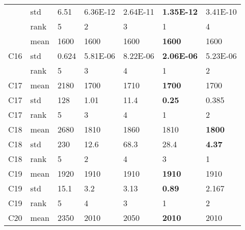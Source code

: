 \begin{table}[]
\begin{tabular}{|l|l|l|l|l|l|l|}
                     & std  & 6.51             & 6.36E-12          & 2.64E-11          & \textbf{1.35E-12} & 3.41E-10          \\ \cline{2-7} 
                     & rank & 5                & 2                 & 3                 & 1                 & 4                 \\ \hline
\multirow{3}{*}{C16} & mean & 1600             & 1600              & 1600              & \textbf{1600}     & 1600              \\ \cline{2-7} 
                     & std  & 0.624            & 5.81E-06          & 8.22E-06          & \textbf{2.06E-06} & 5.23E-06          \\ \cline{2-7} 
                     & rank & 5                & 3                 & 4                 & 1                 & 2                 \\ \hline
C17                  & mean & 2180             & 1700              & 1710              & \textbf{1700}     & 1700              \\ \hline
C17                  & std  & 128              & 1.01              & 11.4              & \textbf{0.25}     & 0.385             \\ \hline
C17                  & rank & 5                & 3                 & 4                 & 1                 & 2                 \\ \hline
C18                  & mean & 2680             & 1810              & 1860              & 1810              & \textbf{1800}     \\ \hline
C18                  & std  & 230              & 12.6              & 68.3              & 28.4              & \textbf{4.37}     \\ \hline
C18                  & rank & 5                & 2                 & 4                 & 3                 & 1                 \\ \hline
C19                  & mean & 1920             & 1910              & 1910              & \textbf{1910}     & 1910              \\ \hline
C19                  & std  & 15.1             & 3.2               & 3.13              & \textbf{0.89}     & 2.167             \\ \hline
C19                  & rank & 5                & 4                 & 3                 & 1                 & 2                 \\ \hline
C20                  & mean & 2350             & 2010              & 2050              & \textbf{2010}     & 2010              \\ \hline

\end{tabular}
\end{table}
